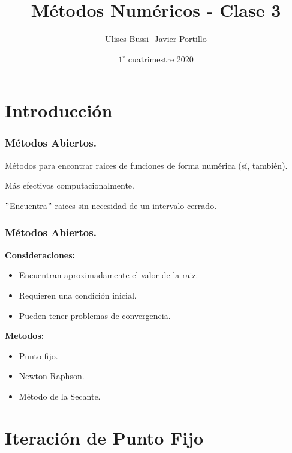 \documentclass[xcolor=svgnames]{beamer} %
\title{Métodos Numéricos - Clase 3}
\author{Ulises Bussi- Javier Portillo}
\date{ $1^\circ$ cuatrimestre 2020}
\theoremstyle{plain}
\renewcommand{\textbf}[1]{{\bfseries\textcolor{redUnq2}{#1}}}
\theoremstyle{definition}
\begin{document}
 


\begin{frame} %
	\titlepage
\end{frame}


\section{Introducción}
\begin{frame}
\frametitle{Métodos Abiertos.}

Métodos para encontrar raices de funciones de forma numérica (sí, también).\vspace{10pt}


\begin{tcolorbox}
  \begin{center}
 	Más efectivos computacionalmente.
  \end{center}
\end{tcolorbox} \vspace{20pt}
\pause


$"$Encuentra$"$ raices sin necesidad de un intervalo cerrado.



\end{frame}




\begin{frame}
\frametitle{Métodos Abiertos.}
\textbf{Consideraciones:}
\begin{itemize}
\item Encuentran aproximadamente el valor de la raiz.
\item Requieren una condición inicial.
\item Pueden tener problemas de convergencia.

\end{itemize}
\pause

\textbf{Metodos:}
\begin{itemize}
\item Punto fijo.
\item Newton-Raphson.
\item Método de la Secante.

\end{itemize}

\end{frame}






\section{Iteración de Punto Fijo}
\end{document}
